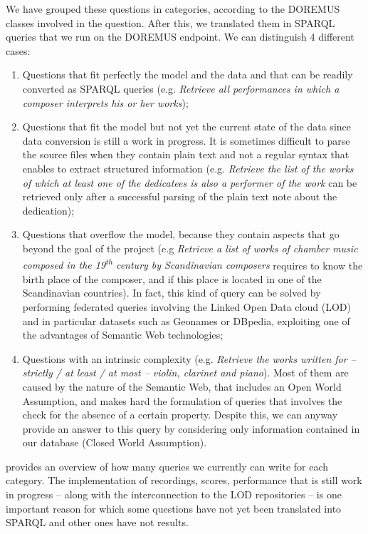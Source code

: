 \documentclass{article}
\begin{document}
We have grouped these questions in categories, according to the DOREMUS classes involved in the question. After this, we translated them in SPARQL queries that we run on the DOREMUS endpoint. We can distinguish 4 different cases:
\begin{enumerate}
 \item Questions that fit perfectly the model and the data and that can be readily converted as SPARQL queries (e.g. \textit{Retrieve all performances in which a composer interprets his or her works});
 \item Questions that fit the model but not yet the current state of the data since data conversion is still a work in progress. It is sometimes difficult to parse the source files when they contain plain text and not a regular syntax that enables to extract structured information (e.g. \textit{Retrieve the list of the works of which at least one of the dedicatees is also a performer of the work} can be retrieved only after a successful parsing of the plain text note about the dedication);
 \item Questions that overflow the model, because they contain aspects that go beyond the goal of the project (e.g \textit{Retrieve a list of works of chamber music composed in the 19\textsuperscript{th} century by Scandinavian composers} requires to know the birth place of the composer, and if this place is located in one of the Scandinavian countries). In fact, this kind of query can be solved by performing federated queries involving the Linked Open Data cloud (LOD) and in particular datasets such as Geonames or DBpedia, exploiting one of the advantages of Semantic Web technologies;
 \item Questions with an intrinsic complexity (e.g. \textit{Retrieve the works written for -- strictly / at least / at most -- violin, clarinet and piano}). Most of them are caused by the nature of the Semantic Web, that includes an Open World Assumption, and makes hard the formulation of queries that involves the check for the absence of a certain property. Despite this, we can anyway provide an answer to this query by considering only information contained in our database (Closed World Assumption).
\end{enumerate}

 provides an overview of how many queries we currently can write for each category. The implementation of recordings, scores, performance that is still work in progress -- along with the interconnection to the LOD repositories -- is one important reason for which some questions have not yet been translated into SPARQL and other ones have not results. 
\end{document}
